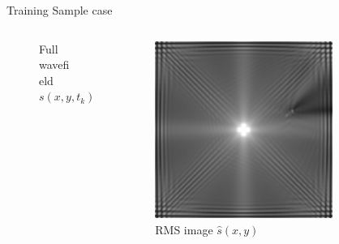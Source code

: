 \documentclass[10pt,aspectratio=169,dvipsnames]{beamer} %
\begin{document}
	\setcounter{subfigure}{0}
	\begin{frame}{Training Sample case}
		\begin{columns}[T]
			\begin{column}[c]{.32\textwidth}
				\begin{figure}
					\centering
					\caption{Full wavefield $s(x,y,t_k)$}
				\end{figure}
			\end{column}
			\begin{column}[c]{.32\textwidth}
				\begin{figure}
					\centering
					\includegraphics[width=0.95 \textwidth]{RMS_flat_shell_Vz_7_500x500bottom.png}
					\caption{RMS image $\hat{s}(x,y)$}
				\end{figure}
			\end{column}
			\begin{column}[c]{.32\textwidth}
				\begin{figure}
					\centering

\end{figure}
\end{column}
\end{columns}
\end{frame}
\end{document}
